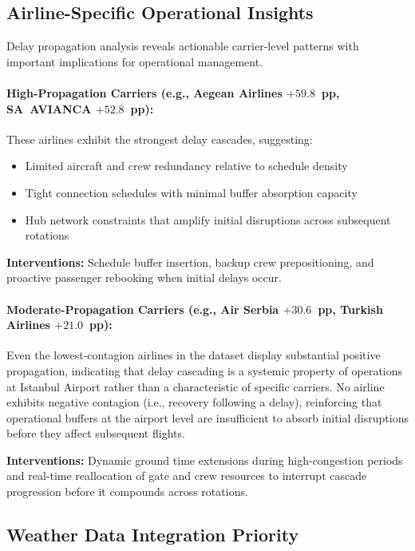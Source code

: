 \documentclass{report}
\begin{document}
\subsection{Airline-Specific Operational Insights}
Delay propagation analysis reveals actionable carrier-level patterns with 
important implications for operational management.

\paragraph{High-Propagation Carriers (e.g., Aegean Airlines $+59.8$~pp, 
SA~AVIANCA $+52.8$~pp):} These airlines exhibit the strongest delay cascades, 
suggesting:
\begin{itemize}
    \item Limited aircraft and crew redundancy relative to schedule density
    \item Tight connection schedules with minimal buffer absorption capacity
    \item Hub network constraints that amplify initial disruptions across 
    subsequent rotations
\end{itemize}
\textbf{Interventions:} Schedule buffer insertion, backup crew prepositioning, 
and proactive passenger rebooking when initial delays occur.

\paragraph{Moderate-Propagation Carriers (e.g., Air Serbia $+30.6$~pp, 
Turkish Airlines $+21.0$~pp):} Even the lowest-contagion airlines in the 
dataset display substantial positive propagation, indicating that delay 
cascading is a systemic property of operations at Istanbul Airport rather 
than a characteristic of specific carriers. No airline exhibits negative 
contagion (i.e., recovery following a delay), reinforcing that operational 
buffers at the airport level are insufficient to absorb initial disruptions 
before they affect subsequent flights.

\textbf{Interventions:} Dynamic ground time extensions during high-congestion 
periods and real-time reallocation of gate and crew resources to interrupt 
cascade progression before it compounds across rotations.




\subsection{Weather Data Integration Priority}
\end{document}
